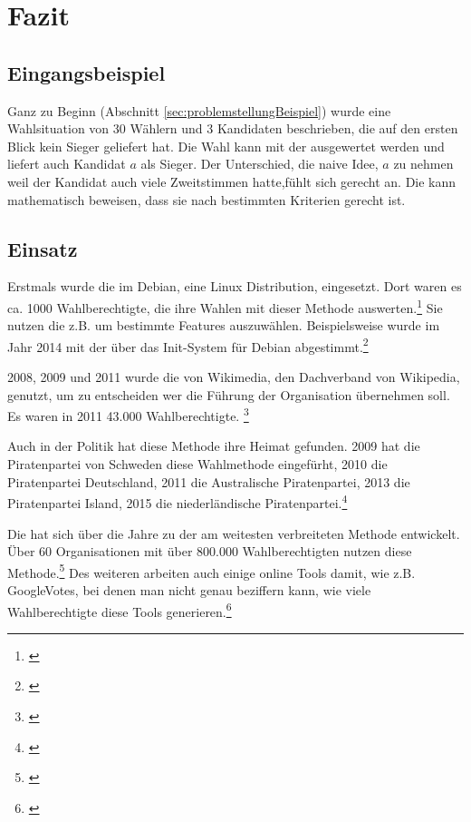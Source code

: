 \newpage
\section{Fazit}
\label{sec:Fazit}

\subsection{Eingangsbeispiel}
Ganz zu Beginn (Abschnitt \ref{sec:problemstellungBeispiel}) wurde eine Wahlsituation von 30 Wählern und 3 Kandidaten beschrieben, die auf den ersten Blick kein Sieger geliefert hat. Die Wahl kann mit der \schulze ausgewertet werden und liefert auch Kandidat $a$ als Sieger. Der Unterschied, die naive Idee, $a$ zu nehmen weil der Kandidat auch viele Zweitstimmen hatte,fühlt sich gerecht an. Die \schulze kann mathematisch beweisen, dass sie nach bestimmten Kriterien gerecht ist.

\subsection{Einsatz} 
\label{sec:einsatz}
Erstmals wurde die  im Debian, eine Linux Distribution, eingesetzt. Dort waren es ca. 1000 Wahlberechtigte, die ihre Wahlen mit dieser Methode auswerten.\footnote{\Vgl \citet{Debian2018}} Sie nutzen die \schulze z.B. um bestimmte Features auszuwählen. Beispielsweise wurde im Jahr 2014 mit der \schulze über das Init-System für Debian abgestimmt.\footnote{\Vgl \citet{Leemhu2014}}



2008, 2009 und 2011 wurde die \schulze von Wikimedia, den Dachverband von Wikipedia, genutzt, um zu entscheiden wer die Führung der Organisation übernehmen soll. Es waren in 2011 43.000 Wahlberechtigte. \footnote{\Vgl \citet{Schulze2017}}

Auch in der Politik hat diese Methode ihre Heimat gefunden. 2009 hat die Piratenpartei von Schweden diese Wahlmethode eingefürht, 2010 die Piratenpartei Deutschland, 2011 die Australische Piratenpartei, 2013 die Piratenpartei Island, 2015 die niederländische Piratenpartei.\footnote{\Vgl \citet{Lohmann2013}}

Die \schulze hat sich über die Jahre zu der am weitesten verbreiteten \condorcet Methode entwickelt. Über 60 Organisationen mit über 800.000 Wahlberechtigten nutzen diese Methode.\footnote{\Vgl \citet{Schulze2018}} Des weiteren arbeiten auch einige online Tools damit, wie z.B. GoogleVotes, bei denen man nicht genau beziffern kann, wie viele Wahlberechtigte diese Tools generieren.\footnote{\Vgl \citet{Hardt2015}}







